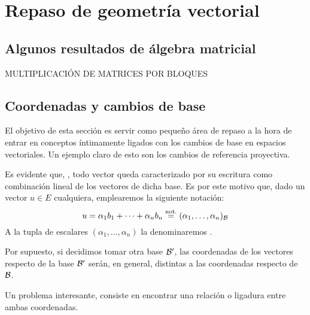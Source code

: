 \chapter{Repaso de geometría vectorial}
\section{Algunos resultados de álgebra matricial}
MULTIPLICACIÓN DE MATRICES POR BLOQUES
\section{Coordenadas y cambios de base}
\label{repasoVect_cambioBase}
El objetivo de esta sección es servir como pequeño área de repaso a la hora de entrar en conceptos íntimamente ligados con los cambios de base en espacios vectoriales. Un ejemplo claro de esto son los cambios de referencia proyectiva.



\begin{obs}
	\label{A1_obs_coordenadasVector}
	Es evidente que, , todo vector queda caracterizado por su escritura como combinación lineal de los vectores de dicha base. Es por este motivo que, dado un vector $u\in E$ cualquiera, emplearemos la siguiente notación:
	\[
		u = \alpha_1b_1+\dots+\alpha_nb_n\stackrel{\textrm{not.}}{=}(\alpha_1,\dots,\alpha_n)_{\mathcal{B}}
	\]
	A la tupla de escalares $(\alpha_1,\dots,\alpha_n)$ la denominaremos .
\end{obs}
Por supuesto, si decidimos tomar otra base $\mathcal{B}'$, las coordenadas de los vectores respecto de la base $\mathcal{B}'$ serán, en general, distintas a las coordenadas respecto de $\mathcal{B}$.

Un problema interesante, consiste en encontrar una relación o ligadura entre ambas coordenadas.
